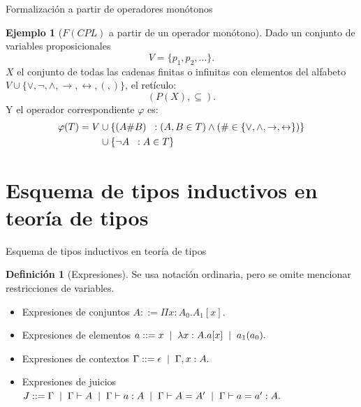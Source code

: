 \documentclass[dvipsnames, 8pt]{beamer} %
\theoremstyle{plain}
\theoremstyle{definition}
\newtheorem{defi}{Definición}
\newtheorem{ejemplo}{Ejemplo}
\begin{document}
\begin{frame}{Formalización a partir de operadores monótonos}
    \begin{ejemplo}[$F(CPL)$ a partir de un operador monótono]
        Dado un conjunto de variables proposicionales
        $$V = \{p_1, p_2,...\}.$$ \pause
        $X$ el conjunto de todas las cadenas finitas o infinitas con elementos del alfabeto $V\cup\{\lor, \lnot, \land, \rightarrow, \leftrightarrow, (, )\}$, el retículo:
        $$(P(X),\subseteq).$$\pause
        Y el operador correspondiente $\varphi$ es:
        \begin{align*}
            \varphi(T) = V &\cup \{(A \# B) \hspace{2mm}: (A , B\in T) \land (\#\in \{\lor, \land, \rightarrow, \leftrightarrow\})\}\\
                            &\cup \{\lnot A \hspace{2mm}:A\in T\}
        \end{align*}
    \end{ejemplo}
\end{frame}

\section{Esquema de tipos inductivos en teoría de tipos}
\begin{frame}{Esquema de tipos inductivos en teoría de tipos}
    \begin{defi}[Expresiones]
        Se usa notación ordinaria, pero se omite mencionar restricciones de variables.
        \begin{itemize}
            \item Expresiones de conjuntos $A ::= \Pi x:A_{0}.A_{1}[x].$ \pause
            \item Expresiones de elementos $a ::= x \hspace{2mm}|\hspace{2mm} \lambda x:A.a[x] \hspace{2mm}|\hspace{2mm} a_1(a_0).$ \pause
            \item Expresiones de contextos $\Gamma ::= \epsilon \hspace{2mm}|\hspace{2mm} \Gamma, x:A.$ \pause
            \item Expresiones de juicios $J ::= \Gamma \hspace{2mm}|\hspace{2mm} \Gamma \vdash A \hspace{2mm}|\hspace{2mm} \Gamma \vdash a:A \hspace{2mm}|\hspace{2mm} \Gamma \vdash A = A' \hspace{2mm}|\hspace{2mm} \Gamma \vdash a = a':A.$
        \end{itemize}
    \end{defi}
\end{frame}
\end{document}
